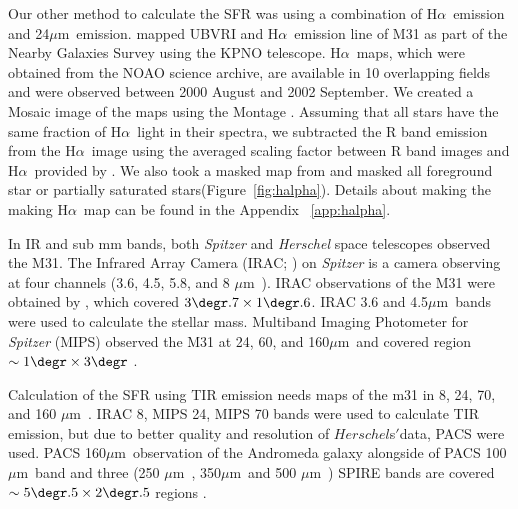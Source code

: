 \documentclass[useAMS,usenatbib]{mn2e}
\newcommand \halpha    {H$\alpha $\ }
\newcommand \um    {$\mu$m\ }
\newcommand \Spitzer {{\it Spitzer }}
\begin{document}
\label{sec:vislight}
Our other method to calculate the SFR was using a combination of \halpha emission and 24\um emission. \cite{Massey06, Massey07} mapped UBVRI and \halpha emission line of M31 as part of the Nearby Galaxies Survey using the KPNO telescope. \halpha maps, which were obtained from the NOAO science archive, are available in 10 overlapping fields and were observed between 2000 August and 2002 September. We created a Mosaic image of the maps using the Montage \citep{Berriman08}. Assuming that all stars have the same fraction of \halpha light in their spectra, we subtracted the R band emission from the \halpha image using the averaged scaling factor between R band images and \halpha provided by \cite{Azimlu11}. We also took a masked map from \cite{Azimlu11} and masked all foreground star or partially saturated stars(Figure~\ref{fig:halpha}). Details about making the making \halpha map can be found in the Appendix ~\ref{app:halpha}.

In IR and sub mm bands, both {\em Spitzer} \citep{Wener04} and {\em Herschel} \citep{Pilbratt10}  space telescopes observed the M31. The Infrared Array Camera (IRAC; \citep{Fazio04}) on {\em Spitzer} is a camera observing at four channels (3.6, 4.5, 5.8, and 8 \um). IRAC observations of the M31 were obtained by \cite{Barmby06}, which covered $3\degr.7 \times 1\degr.6$. IRAC 3.6 and 4.5\um bands  were used to calculate the stellar mass. %
Multiband Imaging Photometer for \Spitzer (MIPS) observed the  M31 at 24, 60, and 160\um and covered region $\sim 1\degr \times 3\degr$ \citep{Gordon06}.

Calculation of the SFR using TIR emission needs maps of the m31 in 8, 24, 70, and 160 \um. IRAC 8, MIPS 24, MIPS 70 bands were used to calculate TIR emission, but due to better quality and resolution of $Herschel$s$'$data, PACS \citep[Photodetector Array Camera and Spectrometer;][]{Poglitsch10} were used. PACS 160\um observation of the Andromeda galaxy alongside of PACS 100 \um band and three (250 \um, 350\um and 500 \um) SPIRE \citep[Spectral and Photometric Imaging Receiver;][]{Griffin10} bands are covered $\sim 5\degr.5 \times 2\degr.5$ regions \citep{Fritz12}.
\end{document}
